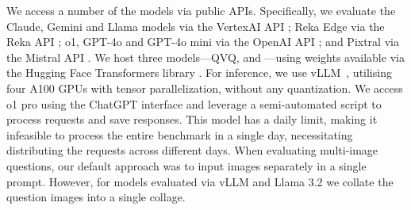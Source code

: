 We access a number of the models via public APIs. Specifically, we evaluate the Claude, Gemini and Llama models via the VertexAI API \cite{vertexaiapi}; Reka Edge via the Reka API \cite{rekaapi}; o1, GPT-4o and GPT-4o mini via the OpenAI API \cite{openaiapi}; and Pixtral via the Mistral API \cite{mistralapi}. We host three models---QVQ, \QwenShort and \NVLMShort---using weights available via the Hugging Face Transformers library \cite{wolf-etal-2020-transformers}. For inference, we use vLLM~\cite{kwon2023efficient}, utilising four A100 GPUs with tensor parallelization, without any quantization. We access o1 pro using the ChatGPT interface and leverage a semi-automated script to process requests and save responses. This model has a daily limit, making it infeasible to process the entire benchmark in a single day, necessitating distributing the requests across different days. When evaluating multi-image questions, our default approach was to input images separately in a single prompt. However, for models evaluated via vLLM and Llama 3.2 we collate the question images into a single collage.













